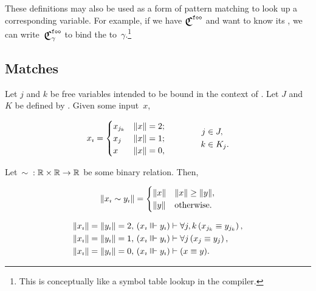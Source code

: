 These definitions may also be used as a form of pattern matching to look up
  a corresponding variable.
For example,
  if we have $\Classify^\texttt{foo}$ and want to know its ,
    we can write~$\Classify^\texttt{foo}_\gamma$ to bind the
     to~$\gamma$.\footnote{%
      This is conceptually like a symbol table lookup in the compiler.}


\subsection{Matches}
\begin{axiom}
  Let $j$ and $k$ be free variables intended to be bound in the
    context of .
  Let $J$ and $K$ be defined by .
  Given some input~$x$,

  \begin{equation*}
    {x}_{\imath} =
      \begin{cases}
        x_{j_k} &\|x\| = 2; \\
        x_j     &\|x\| = 1; \\
        x       &\|x\| = 0,
      \end{cases}
    \qquad\qquad
    \begin{aligned}
      j&\in J, \\
      k&\in K_j.
    \end{aligned}
  \end{equation*}
\end{axiom}

\begin{axiom}
  Let~$\sim{} : \mathbb{R}\times\mathbb{R}\rightarrow\mathbb{R}$ be some binary relation.
  Then,

  \begin{equation*}
    \|{x}_{\imath} \sim {y}_{\imath}\| =
      \begin{cases}
        \|x\| &\|x\| \geq \|y\|, \\
        \|y\| &\text{otherwise}.
      \end{cases}
  \end{equation*}
\end{axiom}

\def\xyequivish{\varsub x\equivish \varsub y}

\begin{axiom}
\indexsym{}
  \begin{align*}
    \|\varsub x\|=\|\varsub y\|=2,\,
      (\xyequivish) &\infer \Forall{j,k}{x_{j_k} \equiv y_{j_k}}, \\
    \|\varsub x\|=\|\varsub y\|=1,\,
      (\xyequivish) &\infer \Forall{j}{x_j \equiv y_j}, \\
    \|\varsub x\|=\|\varsub y\|=0,\,
      (\xyequivish) &\infer (x\equiv y).
  \end{align*}
\end{axiom}

